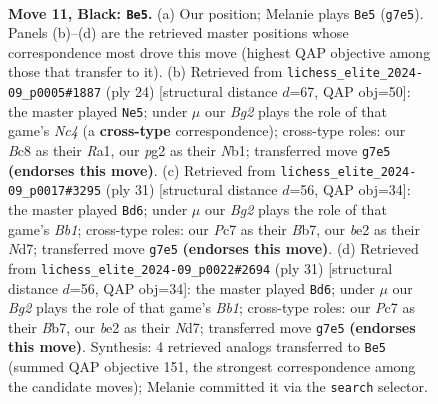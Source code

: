 \documentclass[11pt]{article}
\begin{document}
\clearpage

\begin{figure}[p]\centering
\begin{subfigure}{0.46\textwidth}\centering
\resizebox{\linewidth}{!}{%
\newchessgame
\chessboard[
  setfen={r1bq1rk1/ppp2pbp/3p2p1/7n/2P1P3/2N4P/PP1QBPP1/R1B2RK1 b - - 2 11},
  showmover=false,
  pgfstyle=straightmove, color=movearrow, markmove={g7-e5}
]}
\caption{}
\end{subfigure}\hfill
\begin{subfigure}{0.46\textwidth}\centering
\resizebox{\linewidth}{!}{%
\newchessgame
\chessboard[
  setfen={r1bq1rk1/pp2bppp/1np1p3/8/2NP1P2/4P3/PP3PBP/RN1Q1RK1 w - - 1 13},
  showmover=false,
  pgfstyle=straightmove, color=movearrow, markmove={c4-e5}
]}
\caption{}
\end{subfigure}
\\[4pt]
\begin{subfigure}{0.46\textwidth}\centering
\resizebox{\linewidth}{!}{%
\newchessgame
\chessboard[
  setfen={rb1q1rk1/1b1n1pp1/2p1p2p/pp6/3PB3/4P1N1/PPQ2PPP/R1BR2K1 b - - 0 16},
  showmover=false,
  pgfstyle=straightmove, color=movearrow, markmove={b8-d6}
]}
\caption{}
\end{subfigure}\hfill
\begin{subfigure}{0.46\textwidth}\centering
\resizebox{\linewidth}{!}{%
\newchessgame
\chessboard[
  setfen={rb1q1rk1/1b1n1pp1/2p1p2p/pp6/3PB3/4P1N1/PPQ2PPP/R1BR2K1 b - - 0 16},
  showmover=false,
  pgfstyle=straightmove, color=movearrow, markmove={b8-d6}
]}
\caption{}
\end{subfigure}
\caption{\textbf{Move 11, Black: \texttt{Be5}.} (a) Our position; Melanie plays \texttt{Be5} (\texttt{g7e5}). Panels (b)--(d) are the retrieved master positions whose correspondence most drove this move (highest QAP objective among those that transfer to it). (b) Retrieved from \texttt{lichess\_elite\_2024-09\_p0005\#1887} (ply 24) [structural distance $d$=67, QAP obj=50]: the master played \texttt{Ne5}; under $\mu$ our \emph{Bg2} plays the role of that game's \emph{Nc4} (a \textbf{cross-type} correspondence); cross-type roles: our \emph{B}c8 as their \emph{R}a1, our \emph{p}g2 as their \emph{N}b1; transferred move \texttt{g7e5} \textbf{(endorses this move)}. (c) Retrieved from \texttt{lichess\_elite\_2024-09\_p0017\#3295} (ply 31) [structural distance $d$=56, QAP obj=34]: the master played \texttt{Bd6}; under $\mu$ our \emph{Bg2} plays the role of that game's \emph{Bb1}; cross-type roles: our \emph{P}c7 as their \emph{B}b7, our \emph{b}e2 as their \emph{N}d7; transferred move \texttt{g7e5} \textbf{(endorses this move)}. (d) Retrieved from \texttt{lichess\_elite\_2024-09\_p0022\#2694} (ply 31) [structural distance $d$=56, QAP obj=34]: the master played \texttt{Bd6}; under $\mu$ our \emph{Bg2} plays the role of that game's \emph{Bb1}; cross-type roles: our \emph{P}c7 as their \emph{B}b7, our \emph{b}e2 as their \emph{N}d7; transferred move \texttt{g7e5} \textbf{(endorses this move)}. Synthesis: 4 retrieved analogs transferred to \texttt{Be5} (summed QAP objective 151, the strongest correspondence among the candidate moves); Melanie committed it via the \texttt{search} selector.}
\label{fig:thought-m21}
\end{figure}
\end{document}

